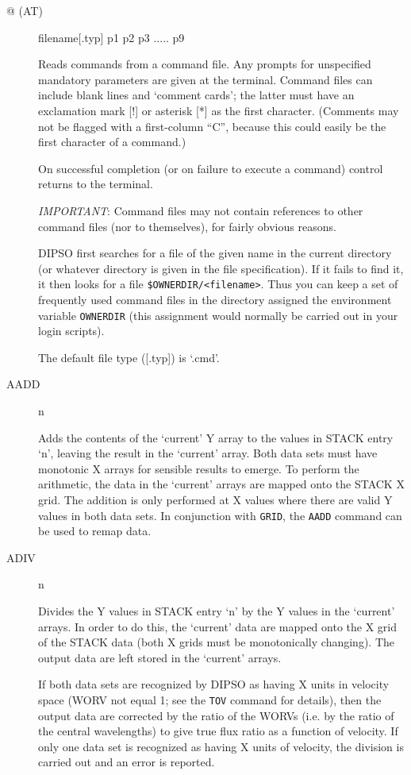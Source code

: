 \documentclass[twoside,11pt]{article}
\newcommand{\htmlref}[2]{#1}
\newcommand{\xlabel}[1]{}
\renewcommand{\_}{\texttt{\symbol{95}}}
\newcommand{\dipcom}[3] { \item [{#1}] {#2} \par }
\newcommand{\dipcom}[3] { \end{description}
                            \subsection{\xlabel{#1}{#1} - {#3}}
                            \label{COM:#1}
                            \begin{description}
                            \item [Syntax:] {\tt{#1} {#2}}
                            \par
                            \item [Description:]}
\begin{document}
\begin {description}

\dipcom{@ (AT)}{filename[.typ] p1 p2 p3 ..... p9}{Reads commands from a command file}
Reads commands from a command file. Any
prompts for unspecified mandatory parameters are given at the
terminal. Command files can include blank lines and `comment cards';
the latter must have an exclamation mark [!] or asterisk [*] as the
first character. (Comments may not be flagged with a first-column
``C'', because this could easily be the first character of a command.)

On successful completion (or on failure to execute a command) control
returns to the terminal.

{\em IMPORTANT}: Command files may not contain references to other
command files (nor to themselves), for fairly obvious reasons.

DIPSO first searches for a file of the given name in the current directory (or
whatever directory is given in the file specification). If it fails to find it,
it then looks for a file {\verb+$OWNERDIR/<filename>+}. Thus you can keep a set
of frequently used command files in the directory assigned the environment
variable {\tt{OWNERDIR}}  (this assignment would normally be carried
out in your login scripts).

The default file type ([.typ]) is `.cmd'.

\dipcom{AADD}{n}{Adds the Y values in two arrays}
Adds the contents of the `current' Y array to the values in STACK
entry `n', leaving the result in the `current' array. Both data sets
must have monotonic X arrays for sensible results to emerge. To
perform the arithmetic, the data in the `current' arrays are mapped
onto the STACK X grid. The addition is only performed at X values
where there are valid Y values in both data sets. In conjunction with
\htmlref{{\tt{GRID}}}{COM:GRID},  the \htmlref{{\tt{AADD}}}{COM:AADD}  command can be used to remap data.

\dipcom{ADIV}{n}{Divides the Y values in two arrays}
Divides the Y values in STACK entry `n' by the Y values in the
`current' arrays. In order to do this, the `current' data are mapped
onto the X grid of the STACK data (both X grids must be monotonically
changing). The output data are left stored in the `current' arrays.

If both data sets are recognized by DIPSO as having X units in velocity
space (WORV not equal 1; see the \htmlref{{\tt{TOV}}}{COM:TOV}  command for details), then the
output data are corrected by the ratio of the WORVs (i.e. by the ratio
of the central wavelengths) to give true flux ratio as a function of
velocity. If only one data set is recognized as having X units of
velocity, the division is carried out and an error is reported.


\end{description}
\end{document}
